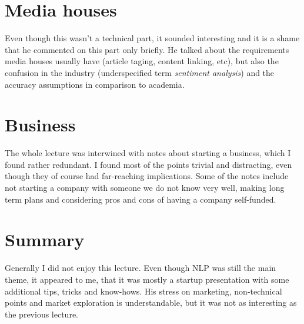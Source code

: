 \documentclass[a4paper]{article}
\begin{document}
\section*{Media houses}
Even though this wasn't a technical part, it sounded interesting and it is a shame that he commented on this part only briefly. He talked about the requirements media houses usually have (article taging, content linking, etc), but also the confusion in the industry (underspecified term \textit{sentiment analysis}) and the accuracy assumptions in comparison to academia.

\section*{Business}
The whole lecture was interwined with notes about starting a business, which I found rather redundant. I found most of the points trivial and distracting, even though they of course had far-reaching implications. Some of the notes include not starting a company with someone we do not know very well, making long term plans and considering pros and cons of having a company self-funded.

\section*{Summary}
Generally I did not enjoy this lecture. Even though NLP was still the main theme, it appeared to me, that it was mostly a startup presentation with some additional tips, tricks and know-hows. His stress on marketing, non-technical points and market exploration is understandable, but it was not as interesting as the previous lecture.
\end{document}
